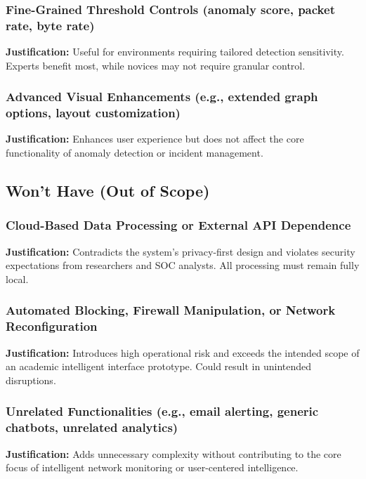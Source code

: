 \documentclass[
    11pt, 
    a4paper, 
    parskip=half, 
    headsepline,       %
    DIV=12             %
]{scrartcl}
\begin{document}
\subsubsection*{Fine-Grained Threshold Controls (anomaly score, packet rate, byte rate)}
\noindent\textbf{Justification:}
Useful for environments requiring tailored detection sensitivity. Experts benefit most, while novices may not require granular control.

\subsubsection*{Advanced Visual Enhancements (e.g., extended graph options, layout customization)}
\noindent\textbf{Justification:}
Enhances user experience but does not affect the core functionality of anomaly detection or incident management.

\subsection{Won't Have (Out of Scope)}

\subsubsection*{Cloud-Based Data Processing or External API Dependence}
\noindent\textbf{Justification:}
Contradicts the system’s privacy-first design and violates security expectations from researchers and SOC analysts. All processing must remain fully local.

\subsubsection*{Automated Blocking, Firewall Manipulation, or Network Reconfiguration}
\noindent\textbf{Justification:}
Introduces high operational risk and exceeds the intended scope of an academic intelligent interface prototype. Could result in unintended disruptions.

\subsubsection*{Unrelated Functionalities (e.g., email alerting, generic chatbots, unrelated analytics)}
\noindent\textbf{Justification:}
Adds unnecessary complexity without contributing to the core focus of intelligent network monitoring or user-centered intelligence.

\newpage


\end{document}
